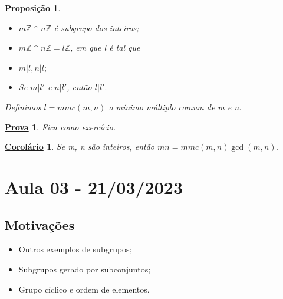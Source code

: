 \documentclass{article}
\newtheorem*{prop*}{\underline{Proposi\c c\~ao}}
\newtheorem*{crl*}{\underline{Corol\'ario}}
\newtheorem*{proof*}{\underline{Prova}}
\begin{document}
\begin{prop*}
 \begin{itemize}
   \item[1)] $m \mathbb{Z}\cap n \mathbb{Z}$ \'e subgrupo dos inteiros;
   \item[2)] $m \mathbb{Z}\cap n \mathbb{Z} = l \mathbb{Z}$, em que l \'e tal que 
     \item[2.1)] $m | l, n | l;$
       \item[2.2)] Se $m | l'$ e $n | l'$, ent\~ao $l | l'.$
 \end{itemize}
 Definimos $l = mmc(m, n)$ o m\'inimo m\'ultiplo comum de m e n.
\end{prop*}
\begin{proof*}
  Fica como exerc\'icio.
\end{proof*}
\begin{crl*}
  Se m, n s\~ao inteiros, ent\~ao $mn = mmc(m, n)\gcd{(m, n)}$.
\end{crl*}
\newpage

\section{Aula 03 - 21/03/2023}
\subsection{Motiva\c c\~oes}
\begin{itemize}
  \item Outros exemplos de subgrupos;
  \item Subgrupos gerado por subconjuntos;
  \item Grupo c\'iclico e ordem de elementos.
\end{itemize}
\end{document}
